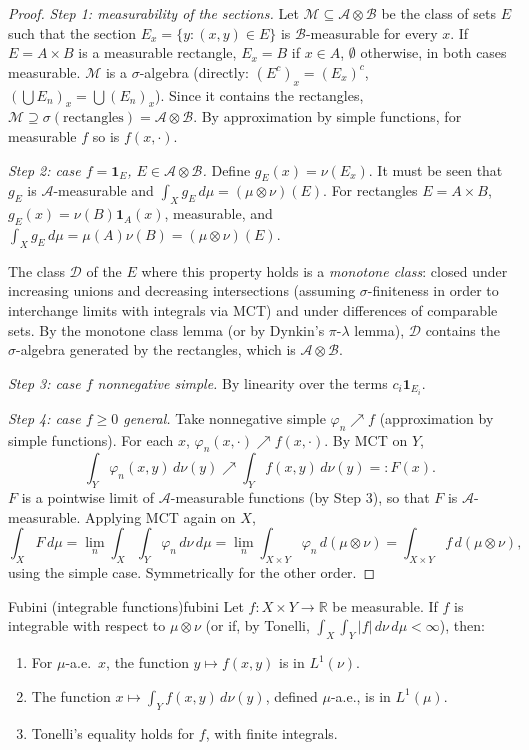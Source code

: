 \documentclass[11pt, a4paper]{article}
\begin{document}
\begin{proof}
\textit{Step 1: measurability of the sections.} Let $\mathcal{M} \subseteq \mathcal{A} \otimes
\mathcal{B}$ be the class of sets $E$ such that the section $E_x = \{y : (x, y) \in E\}$ is
$\mathcal{B}$-measurable for every $x$. If $E = A \times B$ is a measurable rectangle, $E_x = B$ if
$x \in A$, $\emptyset$ otherwise, in both cases measurable. $\mathcal{M}$ is a $\sigma$-algebra
(directly: $(E^c)_x = (E_x)^c$, $(\bigcup E_n)_x = \bigcup (E_n)_x$). Since it contains the
rectangles, $\mathcal{M} \supseteq \sigma(\text{rectangles}) = \mathcal{A} \otimes
\mathcal{B}$. By approximation by simple functions, for measurable $f$ so is $f(x, \cdot)$.

\textit{Step 2: case $f = \mathbf{1}_E$, $E \in \mathcal{A} \otimes \mathcal{B}$.} Define
$g_E(x) = \nu(E_x)$. It must be seen that $g_E$ is $\mathcal{A}$-measurable and $\int_X g_E \, d\mu = (\mu
\otimes \nu)(E)$. For rectangles $E = A \times B$, $g_E(x) = \nu(B) \mathbf{1}_A(x)$, measurable,
and $\int_X g_E \, d\mu = \mu(A) \nu(B) = (\mu \otimes \nu)(E)$.

The class $\mathcal{D}$ of the $E$ where this property holds is a \emph{monotone class}: closed
under increasing unions and decreasing intersections (assuming $\sigma$-finiteness in order to
interchange limits with integrals via MCT) and under differences of comparable sets. By the
monotone class lemma (or by Dynkin's $\pi$-$\lambda$ lemma), $\mathcal{D}$ contains the
$\sigma$-algebra generated by the rectangles, which is $\mathcal{A} \otimes \mathcal{B}$.

\textit{Step 3: case $f$ nonnegative simple.} By linearity over the terms
$c_i \mathbf{1}_{E_i}$.

\textit{Step 4: case $f \ge 0$ general.} Take nonnegative simple $\varphi_n \nearrow f$
(approximation by simple functions). For each $x$, $\varphi_n(x, \cdot) \nearrow f(x, \cdot)$. By MCT on
$Y$,
$$ \int_Y \varphi_n(x, y) \, d\nu(y) \nearrow \int_Y f(x, y) \, d\nu(y) =: F(x). $$
$F$ is a pointwise limit of $\mathcal{A}$-measurable functions (by Step 3), so that $F$ is
$\mathcal{A}$-measurable. Applying MCT again on $X$,
$$ \int_X F \, d\mu = \lim_n \int_X \!\int_Y \varphi_n \, d\nu \, d\mu = \lim_n \int_{X \times Y}
\varphi_n \, d(\mu \otimes \nu) = \int_{X \times Y} f \, d(\mu \otimes \nu), $$
using the simple case. Symmetrically for the other order.
\end{proof}

\begin{teorema}{Fubini (integrable functions)}{fubini}
Let $f: X \times Y \to \mathbb{R}$ be measurable. If $f$ is integrable with respect to $\mu \otimes \nu$
(or if, by Tonelli, $\int_X \int_Y |f| \, d\nu \, d\mu < \infty$), then:
\begin{enumerate}
    \item For $\mu$-a.e.\ $x$, the function $y \mapsto f(x, y)$ is in $L^1(\nu)$.
    \item The function $x \mapsto \int_Y f(x, y) \, d\nu(y)$, defined $\mu$-a.e., is in
    $L^1(\mu)$.
    \item Tonelli's equality holds for $f$, with finite integrals.
\end{enumerate}
\end{teorema}
\end{document}
